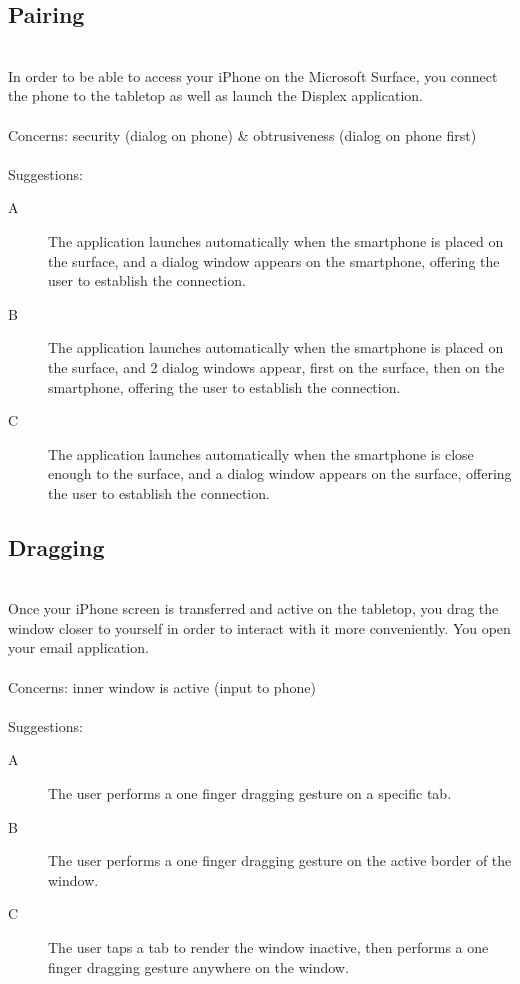 \documentclass[11pt]{amsart}
\begin{document}
\subsection{Pairing}
\hfill\\
In order to be able to access your iPhone on the Microsoft Surface, you connect the phone to the tabletop as well as launch the Displex application.
\\\\
Concerns: security (dialog on phone) \& obtrusiveness (dialog on phone first)
\\\\
Suggestions:
\begin{description}
\item[A]{The application launches automatically when the smartphone is placed on the surface, and a dialog window appears on the smartphone, offering the user to establish the connection.}
\item[B]{The application launches automatically when the smartphone is placed on the surface, and 2 dialog windows appear, first on the surface, then on the smartphone, offering the user to establish the connection.}
\item[C]{The application launches automatically when the smartphone is close enough to the surface, and a dialog window appears on the surface, offering the user to establish the connection.}
\end{description}

\subsection{Dragging}
\hfill\\
Once your iPhone screen is transferred and active on the tabletop, you drag the window closer to yourself in order to interact with it more conveniently. You open your email application.
\\\\
Concerns: inner window is active (input to phone)
\\\\
Suggestions:
\begin{description}
\item[A]{The user performs a one finger dragging gesture on a specific tab.}
\item[B]{The user performs a one finger dragging gesture on the active border of the window.}
\item[C]{The user taps a tab to render the window inactive, then performs a one finger dragging gesture anywhere on the window.}
\end{description}
\end{document}
